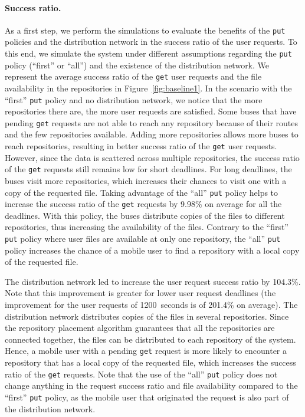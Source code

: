 \paragraph{Success ratio.} 
As a first step, we perform the simulations to evaluate the benefits of the \texttt{put} policies and the distribution network in the success ratio of the user requests. To this end, we simulate the system under different assumptions regarding the \texttt{put} policy (``first''  or ``all'') and the existence of the distribution network. We represent the average success ratio of the \texttt{get} user requests and the file availability in the repositories in Figure~\ref{fig:baseline1}. In the scenario with the ``first'' \texttt{put} policy and no distribution network, we notice that the more repositories there are, the more user requests are satisfied. Some buses that have pending \texttt{get} requests are not able to reach any repository because of their routes and the few repositories available. Adding more repositories allows more buses to reach repositories, resulting in better success ratio of the \texttt{get} user requests. However, since the data is scattered across multiple repositories, the success ratio of the \texttt{get} requests still remains low for short deadlines. For long deadlines, the buses visit more repositories, which increases their chances to visit one with a copy of the requested file. Taking advantage of the ``all'' \texttt{put} policy helps to increase the success ratio of the \texttt{get} requests by 9.98\% on average for all the deadlines. With this policy, the buses distribute copies of the files to different repositories, thus increasing the availability of the files. Contrary to the ``first'' \texttt{put} policy where user files are available at only one repository, the ``all'' \texttt{put} policy increases the chance of a mobile user to find a repository with a local copy of the requested file.

The distribution network led to increase the user request success ratio by 104.3\%. Note that this improvement is greater for lower user request deadlines (\eg the improvement for the user requests of 1200~seconds is of 201.4\% on average). The distribution network distributes copies of the files in several repositories. Since the repository placement algorithm guarantees that all the repositories are connected together, the files can be distributed to each repository of the system. Hence, a mobile user with a pending \texttt{get} request is more likely to encounter a repository that has a local copy of the requested file, which increases the success ratio of the \texttt{get} requests. Note that the use of the ``all'' \texttt{put} policy does not change anything in the request success ratio and file availability compared to the ``first'' \texttt{put} policy, as the mobile user that originated the request is also part of the distribution network.

